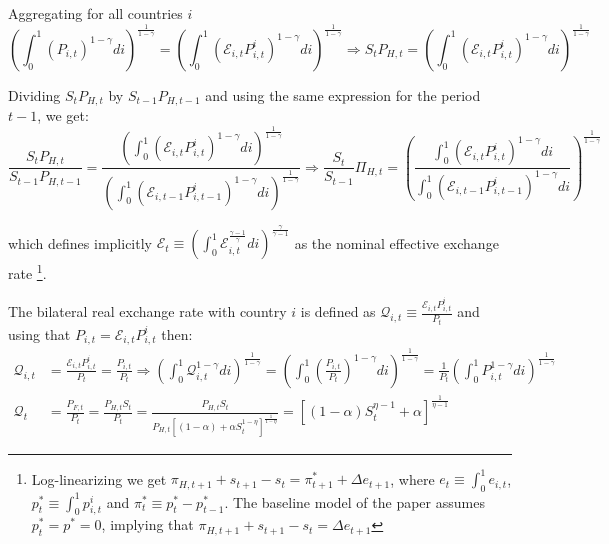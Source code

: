 \documentclass{article}
\newcommand{\E}{\mathcal{E}}
\begin{document}
Aggregating for all countries $i$
\begin{equation}
    \left( \int^1_0 \left(P_{i,t} \right)^{1-\gamma} di \right)^{\frac{1}{1-\gamma}} = \left( \int^1_0 \left(\E_{i,t} P^i_{i,t} \right)^{1-\gamma} di \right)^{\frac{1}{1-\gamma}} \Rightarrow S_t P_{H,t} = \left( \int^1_0 \left(\E_{i,t} P^i_{i,t} \right)^{1-\gamma} di \right)^{\frac{1}{1-\gamma}}
\end{equation}

Dividing $S_t P_{H,t}$ by $S_{t-1} P_{H,t-1}$ and using the same expression for the period $t-1$, we get:
\begin{equation}
    \label{fx}
    \frac{S_t P_{H,t}}{S_{t-1} P_{H,t-1}} = \frac{\left( \int^1_0 \left(\E_{i,t} P^i_{i,t} \right)^{1-\gamma} di \right)^{\frac{1}{1-\gamma}}}{\left( \int^1_0 \left(\E_{i,t-1} P^i_{i,t-1} \right)^{1-\gamma} di \right)^{\frac{1}{1-\gamma}}} \Rightarrow \frac{S_t}{S_{t-1}}\Pi_{H,t} = \left(\frac{\int^1_0 \left(\E_{i,t} P^i_{i,t} \right)^{1-\gamma} di }{\int^1_0 \left(\E_{i,t-1} P^i_{i,t-1} \right)^{1-\gamma} di} \right)^{\frac{1}{1-\gamma}}
\end{equation}

which defines implicitly $\E_{t} \equiv \left( \int^1_0 \E_{i,t}^{\frac{\gamma-1}{\gamma}} di \right)^{\frac{\gamma}{\gamma-1}}$ as the nominal effective exchange rate \footnote{Log-linearizing we get $\pi_{H,t+1} + s_{t+1} - s_t = \pi^*_{t+1} + \Delta e_{t+1}$, where $e_t \equiv \int^1_0 e_{i,t}$, $p_t^* \equiv \int^1_0 p^i_{i,t}$ and $\pi^*_t \equiv p_t^* - p_{t-1}^*$. The baseline model of the paper assumes $p_t^* = p^* = 0$, implying that $\pi_{H,t+1} + s_{t+1} - s_t = \Delta e_{t+1}$}.

The bilateral real exchange rate with country $i$ is defined as $\mathcal{Q}_{i,t} \equiv \frac{\E_{i,t} P^i_{i,t}}{P_t}$ and using that $P_{i,t} = \E_{i,t} P^i_{i,t}$ then:
\begin{equation}
\label{real_rate}
\begin{split}
\mathcal{Q}_{i,t} & = \frac{\E_{i,t} P^i_{i,t}}{P_t} = \frac{P_{i,t}}{P_t} \Rightarrow \left( \int^1_0 \mathcal Q_{i,t}^{1-\gamma} di \right)^{\frac{1}{1-\gamma}} = \left( \int^1_0 \left(\frac{P_{i,t}}{P_t}\right)^{1-\gamma} di \right)^{\frac{1}{1-\gamma}} = \frac{1}{P_t}\left( \int^1_0 P_{i,t}^{1-\gamma} di \right)^{\frac{1}{1-\gamma}} \\
\mathcal{Q}_{t} & = \frac{P_{F,t}}{P_t} = \frac{P_{H,t} S_t}{P_t} = \frac{P_{H,t} S_t}{P_{H,t} \left[(1-\alpha) + \alpha S_t^{1-\eta} \right]^{\frac{1}{1-\eta}}} = \left[(1-\alpha)S_t^{\eta-1} + \alpha \right]^{\frac{1}{\eta-1}}
\end{split}
\end{equation}
\vspace{6pt}
\end{document}
